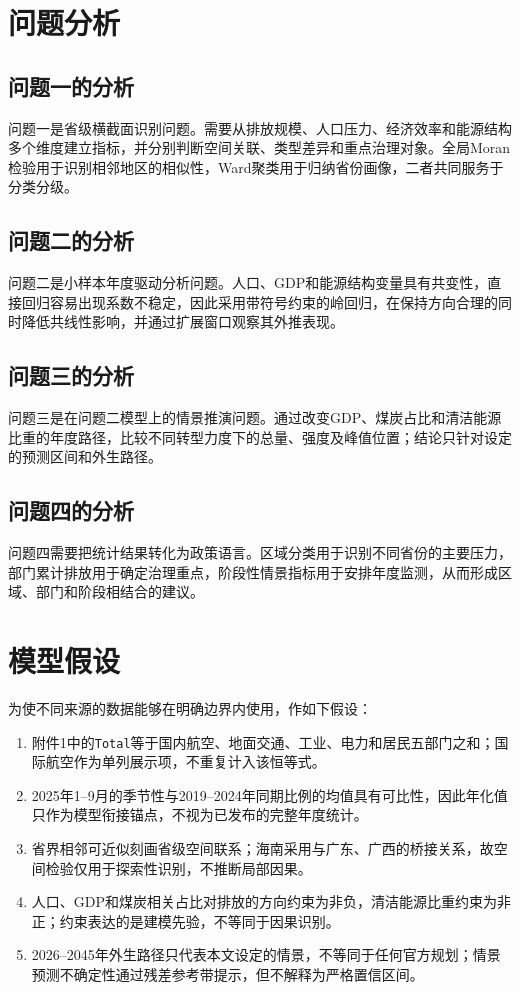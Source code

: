 \documentclass[12pt,a4paper]{ctexart}
\theoremstyle{definition}
\theoremstyle{plain}
\theoremstyle{remark}
\begin{document}
\section{问题分析}

\subsection{问题一的分析}
问题一是省级横截面识别问题。需要从排放规模、人口压力、经济效率和能源结构多个维度建立指标，并分别判断空间关联、类型差异和重点治理对象。全局Moran检验用于识别相邻地区的相似性，Ward聚类用于归纳省份画像，二者共同服务于分类分级。

\subsection{问题二的分析}
问题二是小样本年度驱动分析问题。人口、GDP和能源结构变量具有共变性，直接回归容易出现系数不稳定，因此采用带符号约束的岭回归，在保持方向合理的同时降低共线性影响，并通过扩展窗口观察其外推表现。

\subsection{问题三的分析}
问题三是在问题二模型上的情景推演问题。通过改变GDP、煤炭占比和清洁能源比重的年度路径，比较不同转型力度下的总量、强度及峰值位置；结论只针对设定的预测区间和外生路径。

\subsection{问题四的分析}
问题四需要把统计结果转化为政策语言。区域分类用于识别不同省份的主要压力，部门累计排放用于确定治理重点，阶段性情景指标用于安排年度监测，从而形成区域、部门和阶段相结合的建议。


\section{模型假设}
为使不同来源的数据能够在明确边界内使用，作如下假设：
\begin{enumerate}[label=(\arabic*)]
\item 附件1中的\texttt{Total}等于国内航空、地面交通、工业、电力和居民五部门之和；国际航空作为单列展示项，不重复计入该恒等式。
\item 2025年1--9月的季节性与2019--2024年同期比例的均值具有可比性，因此年化值只作为模型衔接锚点，不视为已发布的完整年度统计。
\item 省界相邻可近似刻画省级空间联系；海南采用与广东、广西的桥接关系，故空间检验仅用于探索性识别，不推断局部因果。
\item 人口、GDP和煤炭相关占比对排放的方向约束为非负，清洁能源比重约束为非正；约束表达的是建模先验，不等同于因果识别。
\item 2026--2045年外生路径只代表本文设定的情景，不等同于任何官方规划；情景预测不确定性通过残差参考带提示，但不解释为严格置信区间。
\end{enumerate}
\end{document}

